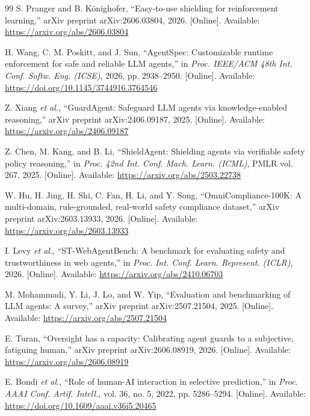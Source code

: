 \documentclass[12pt,a4paper]{article}
\begin{document}
\begin{thebibliography}{99}
 S. Pranger and B. K\"{o}nighofer, ``Easy-to-use shielding for reinforcement learning,'' arXiv preprint arXiv:2606.03804, 2026. [Online]. Available: \url{https://arxiv.org/abs/2606.03804}

 H. Wang, C. M. Poskitt, and J. Sun, ``AgentSpec: Customizable runtime enforcement for safe and reliable LLM agents,'' in \emph{Proc. IEEE/ACM 48th Int. Conf. Softw. Eng. (ICSE)}, 2026, pp. 2938--2950. [Online]. Available: \url{https://doi.org/10.1145/3744916.3764546}

 Z. Xiang \emph{et al.}, ``GuardAgent: Safeguard LLM agents via knowledge-enabled reasoning,'' arXiv preprint arXiv:2406.09187, 2025. [Online]. Available: \url{https://arxiv.org/abs/2406.09187}

 Z. Chen, M. Kang, and B. Li, ``ShieldAgent: Shielding agents via verifiable safety policy reasoning,'' in \emph{Proc. 42nd Int. Conf. Mach. Learn. (ICML)}, PMLR vol. 267, 2025. [Online]. Available: \url{https://arxiv.org/abs/2503.22738}

 W. Hu, H. Jing, H. Shi, C. Fan, H. Li, and Y. Song, ``OmniCompliance-100K: A multi-domain, rule-grounded, real-world safety compliance dataset,'' arXiv preprint arXiv:2603.13933, 2026. [Online]. Available: \url{https://arxiv.org/abs/2603.13933}

 I. Levy \emph{et al.}, ``ST-WebAgentBench: A benchmark for evaluating safety and trustworthiness in web agents,'' in \emph{Proc. Int. Conf. Learn. Represent. (ICLR)}, 2026. [Online]. Available: \url{https://arxiv.org/abs/2410.06703}

 M. Mohammadi, Y. Li, J. Lo, and W. Yip, ``Evaluation and benchmarking of LLM agents: A survey,'' arXiv preprint arXiv:2507.21504, 2025. [Online]. Available: \url{https://arxiv.org/abs/2507.21504}

 E. Turan, ``Oversight has a capacity: Calibrating agent guards to a subjective, fatiguing human,'' arXiv preprint arXiv:2606.08919, 2026. [Online]. Available: \url{https://arxiv.org/abs/2606.08919}

 E. Bondi \emph{et al.}, ``Role of human-AI interaction in selective prediction,'' in \emph{Proc. AAAI Conf. Artif. Intell.}, vol. 36, no. 5, 2022, pp. 5286--5294. [Online]. Available: \url{https://doi.org/10.1609/aaai.v36i5.20465}

\end{thebibliography}
\end{document}
